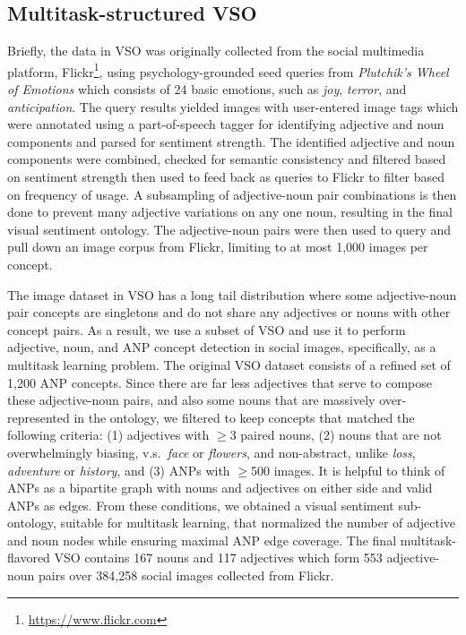 \documentclass{sig-alternate-05-2015}
\begin{document}
\subsection{Multitask-structured VSO}
\label{ssec:mt_vso}

Briefly, the data in VSO \cite{borth_2013} was originally collected from the social multimedia platform, Flickr\footnote{\url{https://www.flickr.com}}, using psychology-grounded seed queries from \emph{Plutchik's Wheel of Emotions} \cite{plutchik_1980} which consists of 24 basic emotions, such as \emph{joy}, \emph{terror}, and \emph{anticipation}.
The query results yielded images with user-entered image tags which were annotated using a part-of-speech tagger for identifying adjective and noun components and parsed for sentiment strength.
The identified adjective and noun components were combined, checked for semantic consistency and filtered based on sentiment strength then used to feed back as queries to Flickr to filter based on frequency of usage.
A subsampling of adjective-noun pair combinations is then done to prevent many adjective variations on any one noun, resulting in the final visual sentiment ontology.
The adjective-noun pairs were then used to query and pull down an image corpus from Flickr, limiting to at most 1,000 images per concept.

The image dataset in VSO \cite{borth_2013} has a long tail distribution where some adjective-noun pair concepts are singletons and do not share any adjectives or nouns with other concept pairs.
As a result, we use a subset of VSO and use it to perform adjective, noun, and ANP concept detection in social images, specifically, as a multitask learning problem.
The original VSO dataset \cite{borth_2013} consists of a refined set of 1,200 ANP concepts.
Since there are far less adjectives that serve to compose these adjective-noun pairs, and also some nouns that are massively over-represented in the ontology, we filtered to keep concepts that matched the following criteria:
(1) adjectives with $\geq$3 paired nouns,
(2) nouns that are not overwhelmingly biasing, v.s.~\emph{face} or \emph{flowers}, and non-abstract, unlike \emph{loss}, \emph{adventure} or \emph{history}, and
(3) ANPs with $\geq$500 images.
It is helpful to think of ANPs as a bipartite graph with nouns and adjectives on either side and valid ANPs as edges.
From these conditions, we obtained a visual sentiment sub-ontology, suitable for multitask learning, that normalized the number of adjective and noun nodes while ensuring maximal ANP edge coverage.
The final multitask-flavored VSO contains 167 nouns and 117 adjectives which form 553 adjective-noun pairs over 384,258 social images collected from Flickr.
\end{document}
